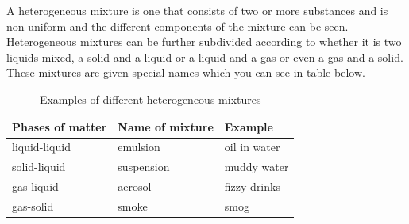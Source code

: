 { \label{m38708*meaningfhsst!!!underscore!!!id89}
        A heterogeneous mixture is one that consists of two or more substances and is non-uniform and the different components of the mixture can be seen.
         } 
Heterogeneous mixtures can be further subdivided according to whether it is two liquids mixed, a solid and a liquid or a liquid and a gas or even a gas and a solid. These mixtures are given special names which you can see in table below. \par
\begin{table}[h!]
 \begin{center}
  \begin{tabular}{|l|l|l|}\hline
   \textbf{Phases of matter} & \textbf{Name of mixture} & \textbf{Example} \\ \hline
   liquid-liquid & emulsion & oil in water \\ \hline
   solid-liquid & suspension & muddy water \\ \hline
   gas-liquid & aerosol & fizzy drinks \\ \hline
   gas-solid & smoke & smog \\ \hline
  \end{tabular}

 \end{center}
\caption{Examples of different heterogeneous mixtures}
\label{tab:mixtures}
\end{table}

      \label{m38708*uid6}
